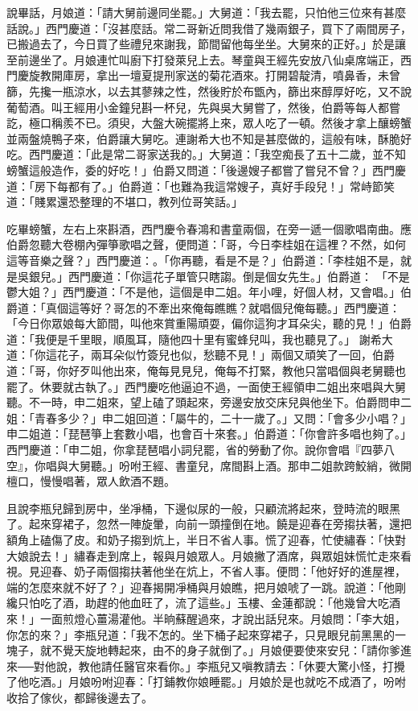 說畢話，月娘道：「請大舅前邊同坐罷。」大舅道：「我去罷，只怕他三位來有甚麼話說。」西門慶道：「沒甚麼話。常二哥新近問我借了幾兩銀子，買下了兩間房子，已搬過去了，今日買了些禮兒來謝我，節間留他每坐坐。大舅來的正好。」於是讓至前邊坐了。月娘連忙叫廚下打發萊兒上去。琴童與王經先安放八仙桌席端正，西門慶旋教開庫房，拿出一壇夏提刑家送的菊花酒來。打開碧靛清，噴鼻香，未曾篩，先攙一瓶涼水，以去其蓼辣之性，然後貯於布甑內，篩出來醇厚好吃，又不說葡萄酒。叫王經用小金鐘兒斟一杯兒，先與吳大舅嘗了，然後，伯爵等每人都嘗訖，極口稱羨不已。須臾，大盤大碗擺將上來，眾人吃了一頓。然後才拿上釀螃蟹並兩盤燒鴨子來，伯爵讓大舅吃。連謝希大也不知是甚麼做的，這般有味，酥脆好吃。西門慶道：「此是常二哥家送我的。」大舅道：「我空痴長了五十二歲，並不知螃蟹這般造作，委的好吃！」伯爵又問道：「後邊嫂子都嘗了嘗兒不曾？」西門慶道：「房下每都有了。」伯爵道：「也難為我這常嫂子，真好手段兒！」常峙節笑道：「賤累還恐整理的不堪口，教列位哥笑話。」

吃畢螃蟹，左右上來斟酒，西門慶令春鴻和書童兩個，在旁一遞一個歌唱南曲。應伯爵忽聽大卷棚內彈箏歌唱之聲，便問道：「哥，今日李桂姐在這裡？不然，如何這等音樂之聲？」西門慶道：。「你再聽，看是不是？」伯爵道：「李桂姐不是，就是吳銀兒。」西門慶道：「你這花子單管只瞎謅。倒是個女先生。」伯爵道： 「不是鬱大姐？」西門慶道：「不是他，這個是申二姐。年小哩，好個人材，又會唱。」伯爵道：「真個這等好？哥怎的不牽出來俺每瞧瞧？就唱個兒俺每聽。」西門慶道：「今日你眾娘每大節間，叫他來賞重陽頑耍，偏你這狗才耳朵尖，聽的見！」伯爵道：「我便是千里眼，順風耳，隨他四十里有蜜蜂兒叫，我也聽見了。」 謝希大道：「你這花子，兩耳朵似竹簽兒也似，愁聽不見！」兩個又頑笑了一回，伯爵道：「哥，你好歹叫他出來，俺每見見兒，俺每不打緊，教他只當唱個與老舅聽也罷了。休要就古執了。」西門慶吃他逼迫不過，一面使王經領申二姐出來唱與大舅聽。不一時，申二姐來，望上磕了頭起來，旁邊安放交床兒與他坐下。伯爵問申二姐：「青春多少？」申二姐回道：「屬牛的，二十一歲了。」又問：「會多少小唱？」申二姐道：「琵琶箏上套數小唱，也會百十來套。」伯爵道：「你會許多唱也夠了。」西門慶道：「申二姐，你拿琵琶唱小詞兒罷，省的勞動了你。說你會唱『四夢八空』，你唱與大舅聽。」吩咐王經、書童兒，席間斟上酒。那申二姐款跨鮫綃，微開檀口，慢慢唱著，眾人飲酒不題。

且說李瓶兒歸到房中，坐凈桶，下邊似尿的一般，只顧流將起來，登時流的眼黑了。起來穿裙子，忽然一陣旋暈，向前一頭撞倒在地。饒是迎春在旁搊扶著，還把額角上磕傷了皮。和奶子搊到炕上，半日不省人事。慌了迎春，忙使繡春：「快對大娘說去！」繡春走到席上，報與月娘眾人。月娘撇了酒席，與眾姐妹慌忙走來看視。見迎春、奶子兩個搊扶著他坐在炕上，不省人事。便問：「他好好的進屋裡，端的怎麼來就不好了？」迎春揭開凈桶與月娘瞧，把月娘唬了一跳。說道：「他剛纔只怕吃了酒，助趕的他血旺了，流了這些。」玉樓、金蓮都說：「他幾曾大吃酒來！」一面煎燈心薑湯灌他。半晌蘇醒過來，才說出話兒來。月娘問：「李大姐，你怎的來？」李瓶兒道：「我不怎的。坐下桶子起來穿裙子，只見眼兒前黑黑的一塊子，就不覺天旋地轉起來，由不的身子就倒了。」月娘便要使來安兒：「請你爹進來──對他說，教他請任醫官來看你。」李瓶兒又嗔教請去：「休要大驚小怪，打攪了他吃酒。」月娘吩咐迎春：「打鋪教你娘睡罷。」月娘於是也就吃不成酒了，吩咐收拾了傢伙，都歸後邊去了。

